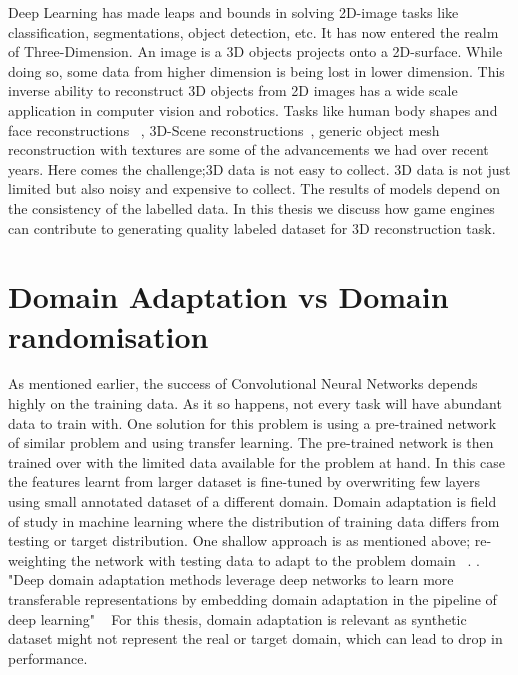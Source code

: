 Deep Learning has made leaps and bounds in solving 2D-image tasks like classification, segmentations, object detection, etc.
It has now entered the realm of Three-Dimension. An image is a 3D objects projects onto a 2D-surface.
While doing so, some data from higher dimension is being lost in lower dimension.
This inverse ability to reconstruct 3D objects from 2D images has a wide scale application in computer vision and robotics.
Tasks like human body shapes and face reconstructions ~\cite{deng2019accurate,Guo20173DFaceNetRD,9210569,richardson20163d,Richardson2017LearningDF},
3D-Scene reconstructions~\cite{Denninger20203DSR,Song2017SemanticSC,LiSilhouetteAssisted3O,Shin20193DSR}, generic object mesh reconstruction with textures are some of the advancements we had over recent years.
Here comes the challenge;3D data is not easy to collect. 3D data is not just limited but also noisy and expensive to collect.
The results of models depend on the consistency of the labelled data.
In this thesis we discuss how game engines can contribute to generating quality labeled dataset for 3D reconstruction task.

\section{Domain Adaptation vs Domain randomisation}

As mentioned earlier, the success of Convolutional Neural Networks depends highly on the training data.
As it so happens, not every task will have abundant data to train with.
One solution for this problem is using a pre-trained network of similar problem and using transfer learning.
The pre-trained network is then trained over with the limited data available for the problem at hand.
In this case the features learnt from larger dataset is fine-tuned by overwriting few layers using small annotated dataset of a different domain.
Domain adaptation is field of study in machine learning where the distribution of training data differs from testing or target distribution.
One shallow approach is as mentioned above; re-weighting the network with testing data to adapt to the problem domain ~\cite{Li2017PredictionRF}.
. "Deep domain adaptation methods
leverage deep networks to learn more transferable representations by embedding domain adaptation in the pipeline of
deep learning" ~\cite{DBLP:journals/corr/abs-1802-03601}
For this thesis, domain adaptation is relevant as synthetic dataset might not represent the real or target domain, which can lead to drop in performance.

